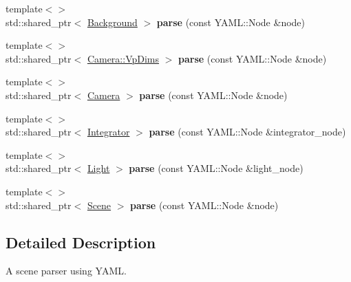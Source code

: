 \begin{DoxyCompactItemize}
{\footnotesize template$<$$>$ }\\std\+::shared\+\_\+ptr$<$ \mbox{\hyperlink{classomg_1_1_background}{Background}} $>$ {\bfseries parse} (const Y\+A\+M\+L\+::\+Node \&node)
\item 
\mbox{\label{classomg_1_1_y_a_m_l_parser_aa7a71ee4f00286dc22e14258b215bfc4}} 
{\footnotesize template$<$$>$ }\\std\+::shared\+\_\+ptr$<$ \mbox{\hyperlink{structomg_1_1_camera_1_1_vp_dims}{Camera\+::\+Vp\+Dims}} $>$ {\bfseries parse} (const Y\+A\+M\+L\+::\+Node \&node)
\item 
\mbox{\label{classomg_1_1_y_a_m_l_parser_aae786077463e555fc165bf237cd71835}} 
{\footnotesize template$<$$>$ }\\std\+::shared\+\_\+ptr$<$ \mbox{\hyperlink{classomg_1_1_camera}{Camera}} $>$ {\bfseries parse} (const Y\+A\+M\+L\+::\+Node \&node)
\item 
\mbox{\label{classomg_1_1_y_a_m_l_parser_a93084f0ddcf54201b05c2afd17768437}} 
{\footnotesize template$<$$>$ }\\std\+::shared\+\_\+ptr$<$ \mbox{\hyperlink{classomg_1_1_integrator}{Integrator}} $>$ {\bfseries parse} (const Y\+A\+M\+L\+::\+Node \&integrator\+\_\+node)
\item 
\mbox{\label{classomg_1_1_y_a_m_l_parser_a9d909cba439b132bcad0440079a1d436}} 
{\footnotesize template$<$$>$ }\\std\+::shared\+\_\+ptr$<$ \mbox{\hyperlink{classomg_1_1_light}{Light}} $>$ {\bfseries parse} (const Y\+A\+M\+L\+::\+Node \&light\+\_\+node)
\item 
\mbox{\label{classomg_1_1_y_a_m_l_parser_a164befb2f6725d60dd2d127651497ec9}} 
{\footnotesize template$<$$>$ }\\std\+::shared\+\_\+ptr$<$ \mbox{\hyperlink{classomg_1_1_scene}{Scene}} $>$ {\bfseries parse} (const Y\+A\+M\+L\+::\+Node \&node)
\end{DoxyCompactItemize}


\subsection{Detailed Description}
A scene parser using Y\+A\+ML. 

